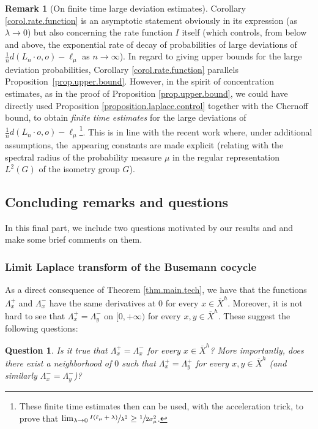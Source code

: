 \documentclass[10pt]{amsart}
\theoremstyle{plain}
\newtheorem{question}[theorem]{Question}
\theoremstyle{definition}
\newtheorem{remark}[theorem]{Remark}
\begin{document}
\begin{remark}[On finite time large deviation estimates]
Corollary \ref{corol.rate.function} is an asymptotic statement obviously in its expression (as $\lambda \to 0$) but also concerning the rate function $I$ itself (which controls, from below and above, the exponential rate of decay of probabilities of large deviations of $\frac{1}{n}d(L_n \cdot o,o)-\ell_\mu$ as $n \to \infty$). In regard to giving upper bounds for the large deviation probabilities, Corollary \ref{corol.rate.function} parallels Proposition~\ref{prop.upper.bound}. However, in the spirit of concentration estimates, as in the proof of Proposition \ref{prop.upper.bound}, we could have directly used Proposition \ref{proposition.laplace.control} together with the Chernoff bound, to obtain \textit{finite time estimates} for the large deviations of $\frac{1}{n}d(L_n \cdot o,o)-\ell_\mu$\footnote{These finite time estimates then can be used, with the acceleration trick, to prove that $\lim_{\lambda \to 0}\sfrac{I(\ell_\mu+\lambda)}{\lambda^2} \geq \sfrac{1}{2\sigma_\mu^2}$.}. This is in line with the recent work \cite{aoun-sert} where, under additional assumptions, the~appearing constants are made explicit (\eg relating with the spectral radius of the probability measure $\mu$ in the regular representation $L^2(G)$ of the isometry group $G$).
\end{remark}

\subsection{Concluding remarks and questions}\label{subsec.questions}
In this final part, we include two questions motivated by our results and and make some brief comments on them.
\subsubsection{Limit Laplace transform of the Busemann cocycle}
As a direct consequence of Theorem \ref{thm.main.tech}, we have that the functions $\Lambda_x^+$ and $\Lambda_x^-$ have the same derivatives at $0$ for every $x\in \overline{X}^h$. Moreover, it is not hard to see that $\Lambda_x^+=\Lambda_y^-$ on $[0,+\infty)$ for every $x,y \in \overline{X}^h$. These suggest the following questions:

\begin{question}\label{question}
Is it true that $\Lambda_x^+=\Lambda_x^-$ for every $x\in \overline{X}^h$? More importantly, does there exist a neighborhood of $0$ such that $\Lambda_x^+=\Lambda_y^+$ for every $x,y\in \overline{X}^h$ (and similarly $\Lambda_x^-=\Lambda_y^-$)?
\end{question}
\end{document}
